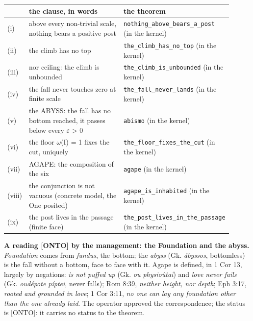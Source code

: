 \documentclass[11pt]{article}
\theoremstyle{definition}\newtheorem{deriv}{Derivation}
\begin{document}
\begin{center}\small\begin{tabular}{p{0.05\linewidth}p{0.5\linewidth}p{0.36\linewidth}}\hline & the clause, in words & the theorem \\ \hline (i) & above every non-trivial scale, nothing bears a positive post & \texttt{nothing\_\allowbreak{}above\_\allowbreak{}bears\_\allowbreak{}a\_\allowbreak{}post} (in the kernel) \\ (ii) & the climb has no top & \texttt{the\_\allowbreak{}climb\_\allowbreak{}has\_\allowbreak{}no\_\allowbreak{}top} (in the kernel) \\ (iii) & nor ceiling: the climb is unbounded & \texttt{the\_\allowbreak{}climb\_\allowbreak{}is\_\allowbreak{}unbounded} (in the kernel) \\ (iv) & the fall never touches zero at finite scale & \texttt{the\_\allowbreak{}fall\_\allowbreak{}never\_\allowbreak{}lands} (in the kernel) \\ (v) & the ABYSS: the fall has no bottom reached, it passes below every $\varepsilon$ > 0 & \texttt{abismo} (in the kernel) \\ (vi) & the floor $\omega$(I) = 1 fixes the cut, uniquely & \texttt{the\_\allowbreak{}floor\_\allowbreak{}fixes\_\allowbreak{}the\_\allowbreak{}cut} (in the kernel) \\ (vii) & AGAPE: the composition of the six & \texttt{agape} (in the kernel) \\ (viii) & the conjunction is not vacuous (concrete model, the One posited) & \texttt{agape\_\allowbreak{}is\_\allowbreak{}inhabited} (in the kernel) \\ (ix) & the post lives in the passage (finite face) & \texttt{the\_\allowbreak{}post\_\allowbreak{}lives\_\allowbreak{}in\_\allowbreak{}the\_\allowbreak{}passage} (in the kernel) \\ \hline\end{tabular}\end{center}

\textbf{A reading \textsf{[ONTO]} by the management: the Foundation and the abyss.} \emph{Foundation} comes from \emph{fundus}, the bottom; the \emph{abyss} (Gk. \emph{ábyssos}, bottomless) is the fall without a bottom, face to face with it. Agape is defined, in 1 Cor 13, largely by negations: \emph{is not puffed up} (Gk. \emph{ou physioûtai}) and \emph{love never fails} (Gk. \emph{oudépote píptei}, never falls); Rom 8:39, \emph{neither height, nor depth}; Eph 3:17, \emph{rooted and grounded in love}; 1 Cor 3:11, \emph{no one can lay any foundation other than the one already laid}. The operator approved the correspondence; the status is \textsf{[ONTO]}: it carries no status to the theorem.
\end{document}

